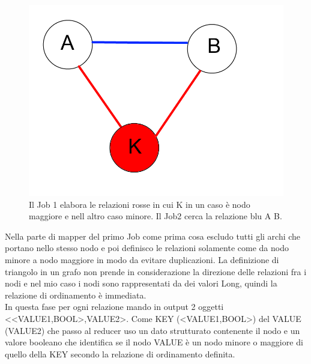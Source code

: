 \documentclass[paper=a4, fontsize=11pt]{scrartcl}	%
\numberwithin{equation}{section}															%
\numberwithin{figure}{section}																%
\numberwithin{table}{section}																%
\begin{document}
\begin{figure}[h]
\centering
        \includegraphics[totalheight=6cm]{Graph1.png}
    \caption{Il Job 1 elabora le relazioni rosse in cui K  in un caso \`e nodo  maggiore e nell altro caso minore. Il Job2 cerca la relazione blu A B.}
    \label{fig:verticalcell} 
\end{figure}

Nella parte di mapper del primo Job come prima cosa escludo tutti gli archi che portano nello stesso nodo e poi definisco le relazioni solamente come da nodo minore a nodo maggiore in modo da evitare duplicazioni. La definizione di triangolo in un grafo non prende in considerazione la direzione delle relazioni fra i nodi e nel mio caso i nodi sono rappresentati da dei valori Long, quindi la relazione di ordinamento \`e immediata.\\ 
In questa fase per ogni relazione mando in output 2 oggetti <<VALUE1,BOOL>,VALUE2>. Come KEY (<VALUE1,BOOL>) del VALUE (VALUE2) che passo al reducer uso un dato strutturato contenente il nodo e un valore booleano che identifica se il nodo VALUE \`e un nodo minore o maggiore di quello della KEY secondo la relazione di ordinamento definita. 
\end{document}
